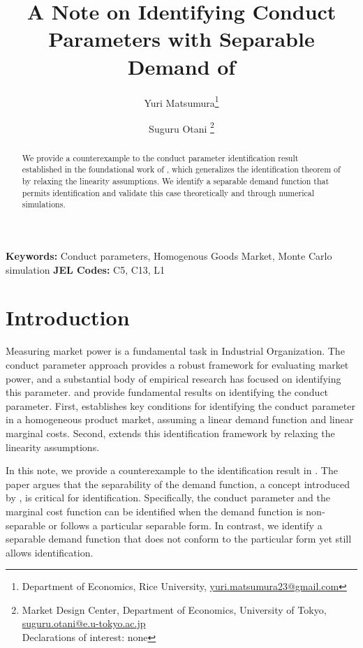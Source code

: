 \documentclass[11pt, a4paper]{article}
\title{A Note on Identifying Conduct Parameters with Separable Demand of \cite{lau1982identifying}}
\author{Yuri Matsumura\thanks{Department of Economics, Rice University, \href{mailto:}{yuri.matsumura23@gmail.com}} \and Suguru Otani \thanks{Market Design Center, Department of Economics, University of Tokyo, \href{mailto:}{suguru.otani@e.u-tokyo.ac.jp}
\\Declarations of interest: none %
}}
\theoremstyle{remark}
\begin{document}
\maketitle
\begin{abstract}
    We provide a counterexample to the conduct parameter identification result established in the foundational work of \citet{lau1982identifying}, which generalizes the identification theorem of \citet{bresnahan1982oligopoly} by relaxing the linearity assumptions. We identify a separable demand function that permits identification and validate this case theoretically and through numerical simulations.
\end{abstract}

\noindent\textbf{Keywords:} Conduct parameters, Homogenous Goods Market, Monte Carlo simulation
\vspace{0in}
\newline
\noindent\textbf{JEL Codes:} C5, C13, L1

\bigskip

\section{Introduction}

Measuring market power is a fundamental task in Industrial Organization. 
The conduct parameter approach provides a robust framework for evaluating market power, and a substantial body of empirical research has focused on identifying this parameter. 
\cite{bresnahan1982oligopoly} and \citet{lau1982identifying} provide fundamental results on identifying the conduct parameter.
First, \citet{bresnahan1982oligopoly} establishes key conditions for identifying the conduct parameter in a homogeneous product market, assuming a linear demand function and linear marginal costs. 
Second, \citet{lau1982identifying} extends this identification framework by relaxing the linearity assumptions.

In this note, we provide a counterexample to the identification result in \citet{lau1982identifying}. 
The paper argues that the separability of the demand function, a concept introduced by \citet{goldmanNote1964}, is critical for identification. 
Specifically, the conduct parameter and the marginal cost function can be identified when the demand function is non-separable or follows a particular separable form.
In contrast, we identify a separable demand function that does not conform to the particular form yet still allows identification. 
\end{document}
